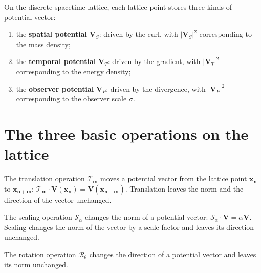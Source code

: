 \begin{definition}\label{def:three_potential_vectors}
On the discrete spacetime lattice, each lattice point stores three kinds of potential vector:
\begin{enumerate}[label=(\roman*)]
    \item the \textbf{spatial potential} $\mathbf{V}_S$: driven by the curl, with $|\mathbf{V}_S|^2$ corresponding to the mass density;
    \item the \textbf{temporal potential} $\mathbf{V}_T$: driven by the gradient, with $|\mathbf{V}_T|^2$ corresponding to the energy density;
    \item the \textbf{observer potential} $\mathbf{V}_P$: driven by the divergence, with $|\mathbf{V}_P|^2$ corresponding to the observer scale $\sigma$.
\end{enumerate}
\end{definition}

\section{The three basic operations on the lattice}\label{sec:lattice_operations}

\begin{definition}\label{def:lattice_translation}
The translation operation $\mathcal{T}_{\mathbf{m}}$ moves a potential vector from the lattice point $\mathbf{x}_{\mathbf{n}}$ to $\mathbf{x}_{\mathbf{n}+\mathbf{m}}$: $\mathcal{T}_{\mathbf{m}}\cdot\mathbf{V}(\mathbf{x}_{\mathbf{n}})=\mathbf{V}(\mathbf{x}_{\mathbf{n}+\mathbf{m}})$. Translation leaves the norm and the direction of the vector unchanged.
\end{definition}

\begin{definition}\label{def:lattice_scaling}
The scaling operation $\mathcal{S}_\alpha$ changes the norm of a potential vector: $\mathcal{S}_\alpha\cdot\mathbf{V}=\alpha\mathbf{V}$. Scaling changes the norm of the vector by a scale factor and leaves its direction unchanged.
\end{definition}

\begin{definition}\label{def:lattice_rotation}
The rotation operation $\mathcal{R}_\theta$ changes the direction of a potential vector and leaves its norm unchanged.
\end{definition}

